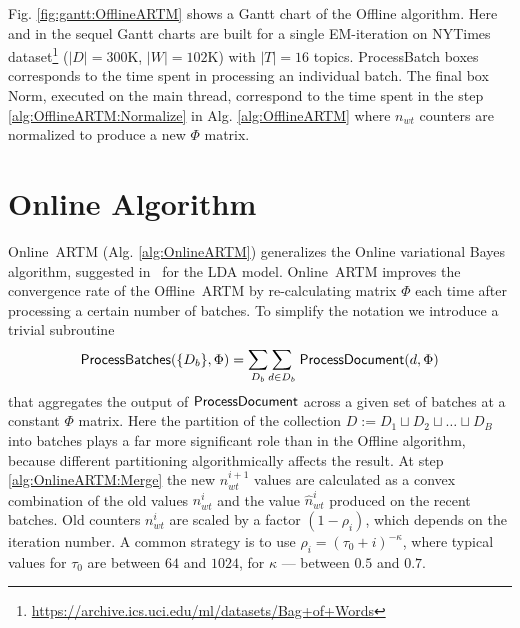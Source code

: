 \documentclass[russian,english]{llncs}
\newcommand{\kw}[1]{\mbox{\textsf{#1}}}
\begin{document}
Fig. \ref{fig:gantt:OfflineARTM} shows a Gantt chart of the \kw{Offline} algorithm.
Here and in the sequel Gantt charts are built for a single EM-iteration on
\kw{NYTimes} dataset\footnote{\url{https://archive.ics.uci.edu/ml/datasets/Bag+of+Words}}
($|D|=300$K, $|W|=102$K) with $|T|=16$ topics.
\kw{ProcessBatch} boxes corresponds to the time spent in processing an individual batch.
The final box \kw{Norm}, executed on the main thread,
correspond to the time spent in the step \ref{alg:OfflineARTM:Normalize} in Alg. \ref{alg:OfflineARTM}
where $n_{wt}$ counters are normalized to produce a new $\Phi$ matrix.


\section{Online Algorithm}
\label{sec:OnlineARTM}

\kw{Online ARTM} (Alg. \ref{alg:OnlineARTM}) generalizes
the Online variational Bayes algorithm,
suggested in~\cite{hoffman10online} for the LDA model.
\kw{Online ARTM} improves the convergence rate of the \kw{Offline ARTM}
by re-calculating matrix $\Phi$ each time after processing a certain number of batches.
To simplify the notation
we introduce a trivial subroutine
\[
\kw{ProcessBatches}(\{D_b\}, \Phi) = \mathlarger\sum\limits_{D_b} \mathlarger\sum\limits_{d \in D_b} \; \kw{ProcessDocument}(d, \Phi) \\
\]
that aggregates the output of $\kw{ProcessDocument}$ across a given set of batches at a constant $\Phi$ matrix.
Here the partition of the collection $D := D_1 \sqcup D_2 \sqcup \dots \sqcup D_B$
into batches
plays a far more significant role than in the \kw{Offline} algorithm,
because different partitioning algorithmically affects the result.
At step \ref{alg:OnlineARTM:Merge} the new $n_{wt}^{i+1}$ values are calculated as a convex combination
of the old values $n_{wt}^{i}$ and the value $\hat n_{wt}^{i}$ produced on the recent batches.
Old counters $n_{wt}^{i}$ are scaled by a factor $(1 - \rho_i)$,
which depends on the iteration number. A common strategy is to use $\rho_i = (\tau_0 + i)^{-\kappa}$,
where typical values for $\tau_0$ are between $64$ and $1024$, for $\kappa$ --- between $0.5$ and $0.7$.
\end{document}
